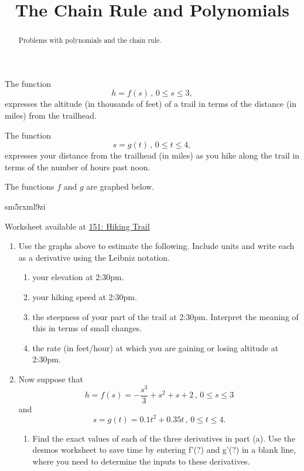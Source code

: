 \documentclass{ximera}
\title{The Chain Rule and Polynomials}
\begin{document}
\begin{abstract}
Problems with polynomials and the chain rule.
\end{abstract}
\maketitle

\begin{question} \label{Q8dfDfrfrf}
The function
\[
      h = f(s) \, , \, 0\leq s \leq 3 ,
\]
expresses the altitude (in thousands of feet) of a trail in terms of the distance (in miles) from the trailhead.

The function
\[
    s = g(t) \, , \, 0\leq t \leq 4,
\]
expresses your distance from the trailhead (in miles) as you hike along the trail in terms of the number of hours past noon.

The functions $f$ and $g$ are graphed below.

\begin{onlineOnly}
    \begin{center}
   sm5rxml9zi
\end{center}
\end{onlineOnly}

Worksheet available at \href{https://www.desmos.com/calculator/sm5rxml9zi}{151: Hiking Trail}  %


\begin{enumerate}

\item Use the graphs above to estimate the following. Include units and write each as a derivative using the Leibniz notation.

\begin{enumerate}

\item your elevation at 2:30pm.

\item your hiking speed at 2:30pm.

\item the steepness of your part of the trail at 2:30pm. Interpret the meaning of this in terms of small changes.

\item the rate (in feet/hour) at which you are gaining or losing altitude at 2:30pm. 
\end{enumerate}

\item Now suppose that
\[
    h = f(s) = -\frac{s^3}{3} + s^2 + s + 2 \, , \, 0\leq s\leq 3
\]
and
\[
    s = g(t) = 0.1 t^2 + 0.35t \, , \, 0\leq t \leq 4.
\]

\begin{enumerate}
\item Find the exact values of each of the three derivatives in part (a). Use the desmos worksheet to save time by entering f'(?) and g'(?) in a blank line, where you need to determine the inputs to these derivatives.
\end{enumerate}
\end{enumerate}

\end{question}
\end{document}
